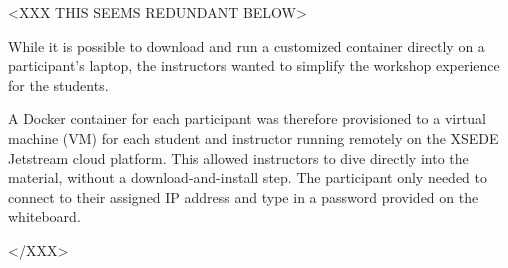 <XXX THIS SEEMS REDUNDANT BELOW>

While it is possible to download and run a customized container directly on a
participant’s laptop, the instructors wanted to simplify the workshop
experience for the students.

A Docker container for each participant was therefore provisioned to
a virtual machine (VM) for each student and instructor running remotely on the
XSEDE Jetstream cloud platform. This allowed instructors to dive directly into
the material, without a download-and-install step. The participant only needed
to connect to their assigned IP address and type in a password provided on the
whiteboard.

</XXX>
